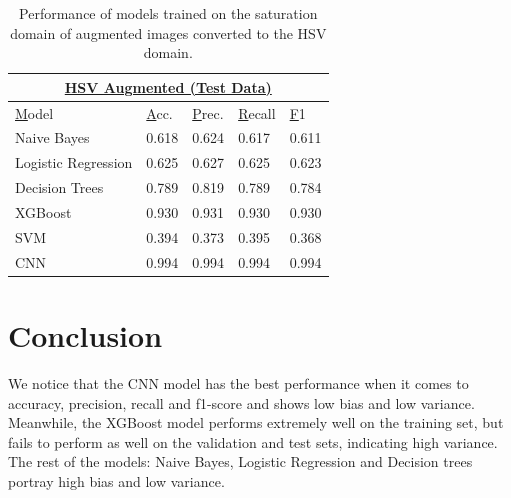 \documentclass[10pt,twocolumn,letterpaper]{article}
\begin{document}
\begin{table}[]
   \begin{tabular}{|lllll|}
   \hline
   \multicolumn{5}{|c|}{{\ul \textbf{HSV Augmented (Test Data)}}}                                                                                                            \\ \hline
   \multicolumn{1}{|l|}{{\ul Model}}         & \multicolumn{1}{l|}{{\ul Acc.}} & \multicolumn{1}{l|}{{\ul Prec.}} & \multicolumn{1}{l|}{{\ul Recall}} & {\ul F1} \\ \hline
   \multicolumn{1}{|l|}{Naive Bayes}         & \multicolumn{1}{l|}{0.618}      & \multicolumn{1}{l|}{0.624}       & \multicolumn{1}{l|}{0.617}        & 0.611    \\ \hline
   \multicolumn{1}{|l|}{Logistic Regression} & \multicolumn{1}{l|}{0.625}      & \multicolumn{1}{l|}{0.627}       & \multicolumn{1}{l|}{0.625}        & 0.623    \\ \hline
   \multicolumn{1}{|l|}{Decision Trees}      & \multicolumn{1}{l|}{0.789}      & \multicolumn{1}{l|}{0.819}       & \multicolumn{1}{l|}{0.789}        & 0.784    \\ \hline
   \multicolumn{1}{|l|}{XGBoost}             & \multicolumn{1}{l|}{0.930}      & \multicolumn{1}{l|}{0.931}       & \multicolumn{1}{l|}{0.930}        & 0.930    \\ \hline
   \multicolumn{1}{|l|}{SVM}                 & \multicolumn{1}{l|}{0.394}      & \multicolumn{1}{l|}{0.373}       & \multicolumn{1}{l|}{0.395}        & 0.368    \\ \hline
   \multicolumn{1}{|l|}{CNN}                 & \multicolumn{1}{l|}{0.994}      & \multicolumn{1}{l|}{0.994}       & \multicolumn{1}{l|}{0.994}        & 0.994    \\ \hline
   \end{tabular}
   \caption{Performance of models trained on the saturation domain of augmented images converted to the HSV domain.}
   \end{table}

\section{Conclusion}

We notice that the CNN model has the best performance when it comes to accuracy, precision, recall and f1-score and shows low bias and low variance. Meanwhile, the XGBoost model performs extremely well on the training set, but fails to perform as well on the validation and test sets, indicating high variance. The rest of the models: Naive Bayes, Logistic Regression and Decision trees portray high bias and low variance. 
\end{document}
